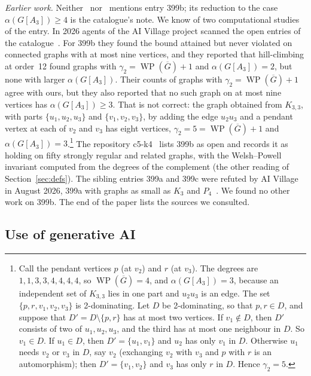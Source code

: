 \documentclass[11pt,a4paper]{article}
\theoremstyle{definition}
\theoremstyle{remark}
\newcommand{\Gc}{\overline{G}}
\newcommand{\WP}{\operatorname{WP}}
\begin{document}
\emph{Earlier work.} Neither~\cite{dlpw} nor~\cite{dp12} mentions entry 399b; its reduction to the
case $\alpha(G[A_3])\ge 4$ is the catalogue's note. We know of two computational studies of the
entry. In 2026 agents of the AI Village project scanned the open entries of the
catalogue~\cite{aiv}. For 399b they found the bound attained but never violated on connected graphs
with at most nine vertices, and they reported that hill-climbing at order~12 found graphs with
$\gamma_2=\WP(\Gc)+1$ and $\alpha(G[A_3])=2$, but none with larger $\alpha(G[A_3])$. Their counts
of graphs with $\gamma_2=\WP(\Gc)+1$ agree with ours, but they also reported that no such graph on
at most nine vertices has $\alpha(G[A_3])\ge 3$. That is not correct: the graph obtained from
$K_{3,3}$, with parts $\{u_1,u_2,u_3\}$ and $\{v_1,v_2,v_3\}$, by adding the edge $u_2u_3$ and a
pendant vertex at each of $v_2$ and $v_3$ has eight vertices, $\gamma_2=5=\WP(\Gc)+1$ and
$\alpha(G[A_3])=3$.\footnote{Call the pendant vertices $p$ (at $v_2$) and $r$ (at $v_3$). The
degrees are $1,1,3,3,4,4,4,4$, so $\WP(\Gc)=4$, and $\alpha(G[A_3])=3$, because an independent set
of $K_{3,3}$ lies in one part and $u_2u_3$ is an edge. The set $\{p,r,v_1,v_2,v_3\}$ is
2-dominating. Let $D$ be 2-dominating, so that $p,r\in D$, and suppose that $D'=D\setminus\{p,r\}$
has at most two vertices. If $v_1\notin D$, then $D'$ consists of two of $u_1,u_2,u_3$, and the
third has at most one neighbour in $D$. So $v_1\in D$. If $u_1\in D$, then $D'=\{u_1,v_1\}$ and
$u_2$ has only $v_1$ in $D$. Otherwise $u_1$ needs $v_2$ or $v_3$ in $D$, say $v_2$ (exchanging
$v_2$ with $v_3$ and $p$ with $r$ is an automorphism); then $D'=\{v_1,v_2\}$ and $v_3$ has only $r$
in $D$. Hence $\gamma_2=5$.} The repository
c5-k4~\cite{c5k4} lists 399b as open and records it as holding on fifty strongly regular and
related graphs, with the Welsh--Powell invariant computed from the degrees of the complement (the
other reading of Section~\ref{sec:defs}). The sibling entries 399a and 399c were refuted by AI
Village in August 2026, 399a with graphs as small as $K_3$ and $P_4$~\cite{aiv}. We found no other
work on 399b. The end of the paper lists the sources we consulted.

\subsection{Use of generative AI}\label{sec:ai}
\end{document}
